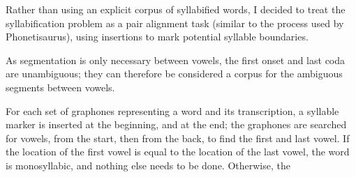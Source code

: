 \documentclass{article}[11pt]
\begin{document}
Rather than using an explicit corpus of syllabified words, I decided to treat the syllabification problem as a pair alignment task (similar to the process used by Phonetisaurus), using insertions to mark potential syllable boundaries.

As segmentation is only necessary between vowels, the first onset and last coda are unambiguous; they can therefore be considered a corpus for the ambiguous segments between vowels.

For each set of graphones representing a word and its transcription, a syllable marker is inserted at the beginning, and at the end; the graphones are searched for vowels, from the start, then from the back, to find the first and last vowel. If the location of the first vowel is equal to the location of the last vowel, the word is monosyllabic, and nothing else needs to be done. Otherwise, the 



%
\end{document}
